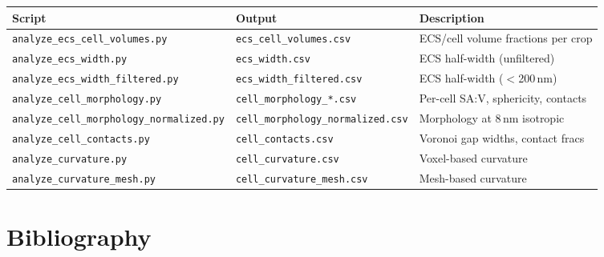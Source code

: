 \documentclass[times, twoside]{zHenriquesLab-StyleBioRxiv}
\begin{document}
\begin{table}[h]
\centering
\footnotesize
\begin{tabular}{p{4.2cm}p{4.5cm}p{5.5cm}}
\toprule
Script & Output & Description \\
\midrule
\texttt{analyze\_ecs\_cell\_volumes.py} & \texttt{ecs\_cell\_volumes.csv} & ECS/cell volume fractions per crop \\
\texttt{analyze\_ecs\_width.py} & \texttt{ecs\_width.csv} & ECS half-width (unfiltered) \\
\texttt{analyze\_ecs\_width\_filtered.py} & \texttt{ecs\_width\_filtered.csv} & ECS half-width ($<$200\,nm) \\
\texttt{analyze\_cell\_morphology.py} & \texttt{cell\_morphology\_*.csv} & Per-cell SA:V, sphericity, contacts \\
\texttt{analyze\_cell\_morphology\_normalized.py} & \texttt{cell\_morphology\_normalized.csv} & Morphology at 8\,nm isotropic \\
\texttt{analyze\_cell\_contacts.py} & \texttt{cell\_contacts.csv} & Voronoi gap widths, contact fracs \\
\texttt{analyze\_curvature.py} & \texttt{cell\_curvature.csv} & Voxel-based curvature \\
\texttt{analyze\_curvature\_mesh.py} & \texttt{cell\_curvature\_mesh.csv} & Mesh-based curvature \\
\bottomrule
\end{tabular}
\end{table}

\section*{Bibliography}

\end{document}
